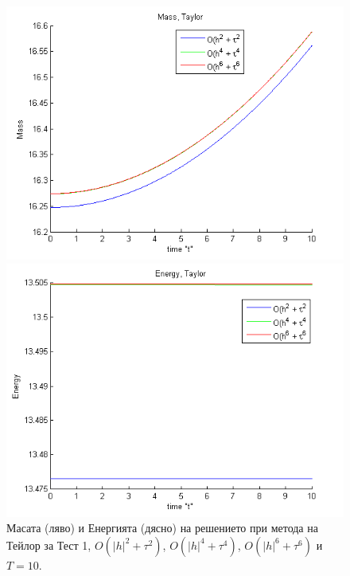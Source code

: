 \documentclass{article}
\begin{document}
\begin{figure}[ht]\vspace{0.4cm}
	\begin{minipage}[b]{0.33\linewidth}
		 \includegraphics[width=\linewidth]{../amitans/figures/Mass_bt1_c090_h010_x3O.png}
	\end{minipage}	
	\begin{minipage}[b]{0.33\linewidth}
		\includegraphics[width=\linewidth]{../amitans/figures/Energy_bt1_c090_h010_x3O.png}
		
	\end{minipage}
\caption{Масата (ляво) и Енергията (дясно) на решението при метода на Тейлор за Тест 1, $O(|h|^2 + \tau^2)$, $O(|h|^4 + \tau^4)$, $O(|h|^6 + \tau^6)$ и $T=10$.}
\label{Test1TEn}
\end{figure}
\end{document}

